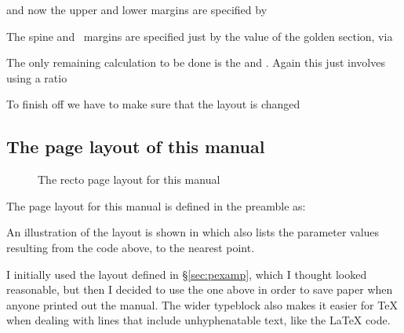 and now the upper and lower margins 
are specified by
\begin{lcode}
\setulmargins{50pt}{*}{*}
\end{lcode}
The spine and \foredge\ margins 
are specified just by the value of the golden section, 
via 
\begin{lcode}
\end{lcode}
The only remaining calculation to be done is the \lnc{\headmargin} and 
\lnc{\headsep}. Again this just involves using a ratio
\begin{lcode}
\end{lcode}
To finish off we have to make sure that the layout is changed 
\begin{lcode}
\checkandfixthelayout
\end{lcode}


\subsection{The page layout of this manual}

\begin{figure}
\currentstock
\oddpagelayouttrue
\twocolumnlayoutfalse
\drawmarginparstrue
\drawparametersfalse
\drawstock
\caption{The recto page layout for this manual}\label{fig:thispagelay}
\end{figure}



    The page layout for this manual is defined in the preamble as:
\begin{lcode}
\settrimmedsize{11in}{210mm}{*}
\setlength{\trimtop}{0pt}
\setlength{\trimedge}{\stockwidth}
\addtolength{\trimedge}{-\paperwidth}
\settypeblocksize{7.75in}{33pc}{*}
\setulmargins{4cm}{*}{*}
\setlrmargins{1.25in}{*}{*}
\setmarginnotes{17pt}{51pt}{\onelineskip}
\setheadfoot{\onelineskip}{2\onelineskip}
\setheaderspaces{*}{2\onelineskip}{*}
\checkandfixthelayout
\end{lcode}

An illustration of the layout is shown in  which also
lists the parameter values resulting from the code above, to the nearest point.

I initially used the layout defined in \S\ref{sec:pexamp}, which I thought
looked reasonable, but then I decided to use the one above in order
to save paper when anyone printed out the manual. The wider
typeblock also makes it easier for TeX when dealing with 
lines that include unhyphenatable text, like the LaTeX code.

